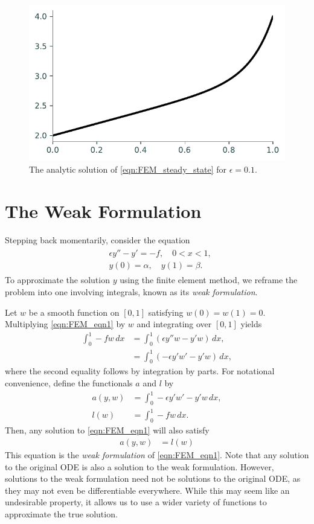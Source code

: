 \begin{figure}[ht]
\centering
\includegraphics[width=\textwidth]{figures/FEM_solution.pdf}
\caption{The analytic solution of \eqref{eqn:FEM_steady_state} for $\epsilon = 0.1$.}
\label{fig:FEM_analytic_solution}
\end{figure}

\section*{The Weak Formulation}
Stepping back momentarily, consider the equation
\begin{align}
	\begin{split}
	&{ }\epsilon y'' - y' = -f, \quad 0 < x < 1,\\
	&{ }y(0) = \alpha, \quad y(1) = \beta .
	\end{split}\label{eqn:FEM_eqn1}
\end{align}
To approximate the solution $y$ using the finite element method, we reframe the problem into one involving integrals, known as its \textit{weak formulation}.

Let $w$ be a smooth function on $[0,1]$ satisfying $w(0) = w(1) = 0$.
Multiplying \eqref{eqn:FEM_eqn1} by $w$ and integrating over $[0,1]$ yields
\begin{align*}
	\int_0^1 -f w\,dx &= \int_0^1 (\epsilon y''w - y'w)\, dx, \\
	&= \int_0^1 (-\epsilon y'w' - y'w)\,dx,
\end{align*}
where the second equality follows by integration by parts.
For notational convenience, define the functionals $a$ and $l$ by
\begin{align*}
a(y,w) &= \int_0^1 -\epsilon y'w' - y'w\,dx,\\
l(w) &= \int_0^1 -f w\,dx.
\end{align*}
Then, any solution to \eqref{eqn:FEM_eqn1} will also satisfy
\begin{align}
	a(y,w) &= l(w)
	\label{eqn:FEM_integral_form}
\end{align}
This equation is the \textit{weak formulation} of \eqref{eqn:FEM_eqn1}.
Note that any solution to the original ODE is also a solution to the weak formulation.
However, solutions to the weak formulation need not be solutions to the original ODE, as they may not even be differentiable everywhere.
While this may seem like an undesirable property, it allows us to use a wider variety of functions to approximate the true solution.

